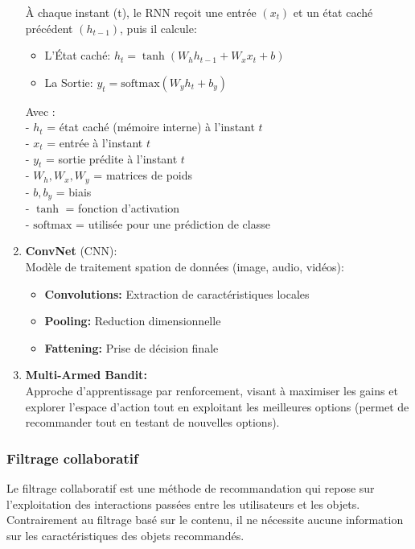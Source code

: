 \documentclass{article}
\begin{document}
\begin{enumerate}
          À chaque instant (t), le RNN reçoit une entrée \((x_t)\) et un état caché précédent \((h_{t-1})\), puis il calcule:
          \begin{itemize}
              \item L'État caché: \(h_t = \tanh(W_h h_{t-1} + W_x x_t + b)\)
              \item  La Sortie: \(y_t = \text{softmax}(W_y h_t + b_y)\)
          \end{itemize}
          Avec :\\
          - \( h_t \) = état caché (mémoire interne) à l’instant \( t \)\\
          - \( x_t \) = entrée à l’instant \( t \)\\
          - \( y_t \) = sortie prédite à l’instant \( t \)\\
          - \( W_h, W_x, W_y \) = matrices de poids\\
          - \( b, b_y \) = biais\\
          - \( \tanh \) = fonction d’activation\\
          - \( \text{softmax} \) = utilisée pour une prédiction de classe\\

    \item \textbf{ConvNet} (CNN):\\
          Modèle de traitement spation de données (image, audio, vidéos):
          \begin{itemize}
              \item \textbf{Convolutions:} Extraction de caractéristiques locales
              \item \textbf{Pooling:} Reduction dimensionnelle
              \item \textbf{Fattening:} Prise de décision finale
          \end{itemize}

    \item \textbf{Multi-Armed Bandit: }\\
          Approche d'apprentissage par renforcement, visant à maximiser les gains et explorer l'espace d'action tout en exploitant les meilleures options (permet de recommander tout en testant de nouvelles options).


\end{enumerate}

\subsubsection{Filtrage collaboratif}
Le filtrage collaboratif est une méthode de recommandation qui repose sur l’exploitation des interactions passées entre les utilisateurs
et les objets.
Contrairement au filtrage basé sur le contenu, il ne nécessite aucune information sur les caractéristiques des objets recommandés.
\end{document}
